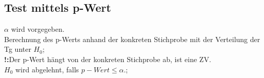 \subsection{Test mittels p-Wert}
$ \alpha $ wird vorgegeben.\\
Berechnung des p-Werts anhand der konkreten Stichprobe mit der Verteilung der Tg unter $ H_{0}  $;\\
\textbf{!:}Der p-Wert hängt von der konkreten Stichprobe ab, ist eine ZV.\\
$ H_{0} $ wird abgelehnt, falls $ p-Wert \le \alpha. $;

